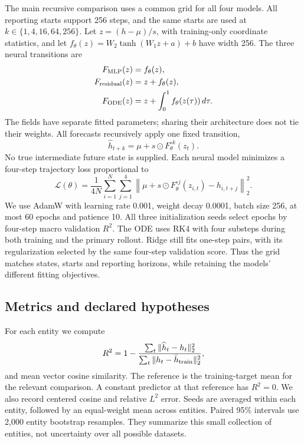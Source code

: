\documentclass[10pt,a4paper,twocolumn]{article}
\begin{document}
The main recursive comparison uses a common grid for all four models.
All reporting starts support 256 steps, and the same starts are used at $k\in\{1,4,16,64,256\}$.
Let $z=(h-\mu)/s$, with training-only coordinate statistics, and let
$f_\theta(z)=W_2\tanh(W_1z+a)+b$ have width 256.
The three neural transitions are
\begin{align}
 F_{\rm MLP}(z)&=f_\theta(z),\\
 F_{\rm residual}(z)&=z+f_\theta(z),\\
 F_{\rm ODE}(z)&=z+\int_0^1 f_\theta(z(\tau))\,d\tau.
\end{align}
The fields have separate fitted parameters; sharing their architecture does not tie their weights.
All forecasts recursively apply one fixed transition,
\begin{equation}
 \widehat h_{t+k}=\mu+s\odot F_\theta^{\circ k}(z_t).
\end{equation}
No true intermediate future state is supplied.
Each neural model minimizes a four-step trajectory loss proportional to
\begin{equation}
 \mathcal L(\theta)=\frac{1}{4N}\sum_{i=1}^N\sum_{j=1}^{4}
 \left\|\mu+s\odot F_\theta^{\circ j}(z_{i,t})-h_{i,t+j}\right\|_2^2.
\end{equation}
We use AdamW with learning rate 0.001, weight decay 0.0001, batch size 256, at most 60 epochs and patience 10.
All three initialization seeds select epochs by four-step macro validation $R^2$.
The ODE uses RK4 with four substeps during both training and the primary rollout.
Ridge still fits one-step pairs, with its regularization selected by the same four-step validation score.
Thus the grid matches states, starts and reporting horizons, while retaining the models' different fitting objectives.

\subsection{Metrics and declared hypotheses}
For each entity we compute
\begin{equation}
 R^2=1-\frac{\sum_t\|\widehat h_t-h_t\|_2^2}
                  {\sum_t\|h_t-\bar h_{\rm train}\|_2^2},
\end{equation}
and mean vector cosine similarity.
The reference is the training-target mean for the relevant comparison.
A constant predictor at that reference has $R^2=0$.
We also record centered cosine and relative $L^2$ error.
Seeds are averaged within each entity, followed by an equal-weight mean across entities.
Paired 95\% intervals use 2,000 entity bootstrap resamples.
They summarize this small collection of entities, not uncertainty over all possible datasets.
\end{document}
